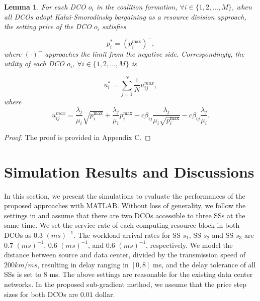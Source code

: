 \documentclass[twocolumn,10pt]{IEEEtran}
\newtheorem{lemma}{Lemma}
\newtheorem{proof}{Proof}
\begin{document}
\begin{lemma} \label{theorem2}
For each DCO $o_{i}$ in the coalition formation, $\forall i \in \{1,2,\ldots,M\}$, when all DCOs adopt Kalai-Smorodinsky bargaining as a resource division approach, the setting price of the DCO $o_{i}$ satisfies

\begin{equation}
    p_{i}^*= {\left({p_{i}^{\max }} \right)}^ -,
\end{equation}
where $\left({\cdot}\right)^-$ approaches the limit from the negative side. Correspondingly, the utility of each DCO $o_i$, $\forall i \in \{1,2,\ldots,M\}$ is

\begin{equation}
    u_i^*= {\sum\limits_{j = 1}^N \frac{1}{N}{u^{max}_{ij}} },
\end{equation}
where
\begin{equation}
u^{max}_{{i}j}={\frac{{{\lambda _j}}}{{{\mu _{i}}}}\sqrt {p_{i}^{\max }}  + \frac{{{\lambda _j}}}{{{\mu _{i}}}}p_{i}^{\max } - c{\beta _{{i}j}}\frac{{{\lambda _j}}}{{{\mu _{i}}\sqrt {p_{i}^{\max }} }} - c{\beta _{{i}j}}\frac{{{\lambda _j}}}{{{\mu _{i}}}}}.
\end{equation}


\end{lemma}
\begin{proof}
The proof is provided in Appendix C. \end{proof}

\vspace{0.5 cm}


\section{Simulation Results and Discussions}\label{sec:simulations}




In this section, we present the simulations to evaluate the performances of the proposed approaches with MATLAB. Without loss of generality, we follow the settings in \cite{ZLiu01} and assume that there are two DCOs accessible to three SSs at the same time. We set the service rate of each computing resource block in both DCOs as $0.3$ $(ms)^{-1}$. The workload arrival rates for SS $s_1$, SS $s_2$ and SS $s_3$ are $0.7$ $(ms)^{-1}$, $0.6$ $(ms)^{-1}$, and $0.6$ $(ms)^{-1}$, respectively. We model the distance between source and data center, divided by the transmission
speed of $200 km/ms$, resulting in delay ranging in $[0, 8]$ ms, and the delay tolerance of all SSs is set to $8$ ms. The above settings are reasonable for the existing data center networks. \cite{ZLiu01} In the proposed sub-gradient method, we assume that the price step sizes for both DCOs are $0.01$ dollar.
\end{document}
